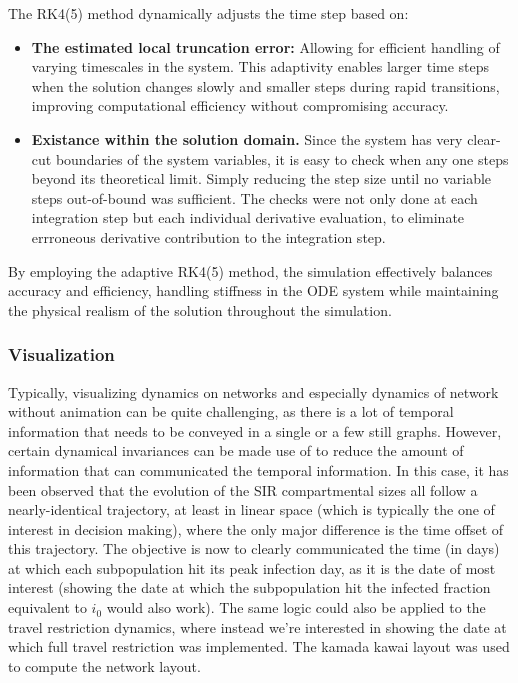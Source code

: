 The RK4(5) method dynamically adjusts the time step based on:
\begin{itemize}
	\item \textbf{The estimated local truncation error:} Allowing for efficient handling of varying timescales in the system. This adaptivity enables larger time steps when the solution changes slowly and smaller steps during rapid transitions, improving computational efficiency without compromising accuracy.
	\item \textbf{Existance within the solution domain.} Since the system has very clear-cut boundaries of the system variables, it is easy to check when any one steps beyond its theoretical limit. Simply reducing the step size until no variable steps out-of-bound was sufficient. The checks were not only done at each integration step but each individual derivative evaluation, to eliminate errroneous derivative contribution to the integration step.
\end{itemize}  

By employing the adaptive RK4(5) method, the simulation effectively balances accuracy and efficiency, handling stiffness in the ODE system while maintaining the physical realism of the solution throughout the simulation.


\subsubsection{Visualization}
Typically, visualizing dynamics on networks and especially dynamics of network without animation can be quite challenging, as there is a lot of temporal information that needs to be conveyed in a single or a few still graphs. However, certain dynamical invariances can be made use of to reduce the amount of information that can communicated the temporal information. In this case, it has been observed that the evolution of the SIR compartmental sizes all follow a nearly-identical trajectory, at least in linear space (which is typically the one of interest in decision making), where the only major difference is the time offset of this trajectory. The objective is now to clearly communicated the time (in days) at which each subpopulation hit its peak infection day, as it is the date of most interest (showing the date at which the subpopulation hit the infected fraction equivalent to $i_0$ would also work). The same logic could also be applied to the travel restriction dynamics, where instead we're interested in showing the date at which full travel restriction was implemented. The kamada kawai layout was used to compute the network layout. 

